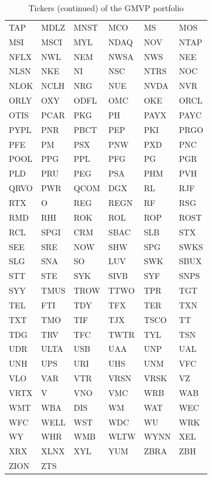 \documentclass[a4paper]{article}
\begin{document}
\begin{table}[htbp]
\caption{Tickers (continued) of the GMVP portfolio}
\label{table:tickersCont}
\centering
\begin{tabular}{ |C{2cm}|C{2cm}|C{2cm}|C{2cm}|C{2cm}|C{2cm}|  }
	\hline
	TAP & MDLZ & MNST & MCO & MS & MOS\\
	MSI & MSCI & MYL & NDAQ & NOV & NTAP\\
	NFLX & NWL & NEM & NWSA & NWS & NEE\\
	NLSN & NKE & NI & NSC & NTRS & NOC\\
	NLOK & NCLH & NRG & NUE & NVDA & NVR\\
	ORLY & OXY & ODFL & OMC & OKE & ORCL\\
	OTIS & PCAR & PKG & PH & PAYX & PAYC\\
	PYPL & PNR & PBCT & PEP & PKI & PRGO\\
	PFE & PM & PSX & PNW & PXD & PNC\\
	POOL & PPG & PPL & PFG & PG & PGR\\
	PLD & PRU & PEG & PSA & PHM & PVH\\
	QRVO & PWR & QCOM & DGX & RL & RJF\\
	RTX & O & REG & REGN & RF & RSG\\
	RMD & RHI & ROK & ROL & ROP & ROST\\
	RCL & SPGI & CRM & SBAC & SLB & STX\\
	SEE & SRE & NOW & SHW & SPG & SWKS\\
	SLG & SNA & SO & LUV & SWK & SBUX\\
	STT & STE & SYK & SIVB & SYF & SNPS\\
	SYY & TMUS & TROW & TTWO & TPR & TGT\\
	TEL & FTI & TDY & TFX & TER & TXN\\
	TXT & TMO & TIF & TJX & TSCO & TT\\
	TDG & TRV & TFC & TWTR & TYL & TSN\\
	UDR & ULTA & USB & UAA & UNP & UAL\\
	UNH & UPS & URI & UHS & UNM & VFC\\
	VLO & VAR & VTR & VRSN & VRSK & VZ\\
	VRTX & V & VNO & VMC & WRB & WAB\\
	WMT & WBA & DIS & WM & WAT & WEC\\
	WFC & WELL & WST & WDC & WU & WRK\\
	WY & WHR & WMB & WLTW & WYNN & XEL\\
	XRX & XLNX & XYL & YUM & ZBRA & ZBH\\
	ZION & ZTS & & & & \\
	\hline
\end{tabular}
\end{table}


\end{document}
